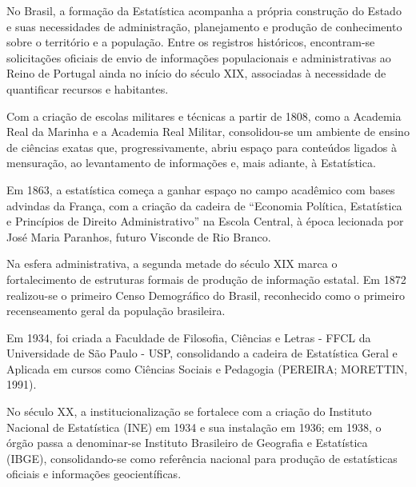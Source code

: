 No Brasil, a formação da Estatística acompanha a própria construção do Estado e suas necessidades de administração, planejamento e produção de conhecimento sobre o território e a população. Entre os registros históricos, encontram-se solicitações oficiais de envio de informações populacionais e administrativas ao Reino de Portugal ainda no início do século XIX, associadas à necessidade de quantificar recursos e habitantes.\vskip0.3cm

Com a criação de escolas militares e técnicas a partir de 1808, como a Academia Real da Marinha e a Academia Real Militar, consolidou-se um ambiente de ensino de ciências exatas que, progressivamente, abriu espaço para conteúdos ligados à mensuração, ao levantamento de informações e, mais adiante, à Estatística.\vskip0.3cm

Em 1863, a estatística começa a ganhar espaço no campo acadêmico com bases advindas da França, com a criação da cadeira de ``Economia Política, Estatística e Princípios de Direito Administrativo'' na Escola Central, à época lecionada por José Maria Paranhos, futuro Visconde de Rio Branco.\vskip0.3cm

\newpage
Na esfera administrativa, a segunda metade do século XIX marca o fortalecimento de estruturas formais de produção de informação estatal. Em 1872 realizou-se o primeiro Censo Demográfico do Brasil, reconhecido como o primeiro recenseamento geral da população brasileira.


\vskip0.3cm

Em 1934, foi criada a Faculdade de Filosofia, Ciências e Letras - FFCL da Universidade de São Paulo - USP, consolidando a cadeira de Estatística Geral e Aplicada em cursos como Ciências Sociais e Pedagogia (PEREIRA; MORETTIN, 1991).\vskip0.3cm

No século XX, a institucionalização se fortalece com a criação do Instituto Nacional de Estatística (INE) em 1934 e sua instalação em 1936; em 1938, o órgão passa a denominar-se Instituto Brasileiro de Geografia e Estatística (IBGE), consolidando-se como referência nacional para produção de estatísticas oficiais e informações geocientíficas.


